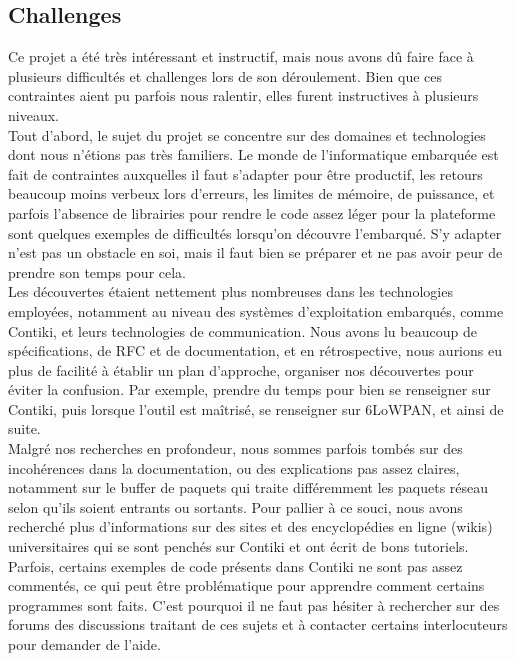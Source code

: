 	\subsection{Challenges} %
	    Ce projet a été très intéressant et instructif, mais nous avons dû faire face à plusieurs difficultés et challenges lors de son déroulement. Bien que ces contraintes aient pu parfois nous ralentir, elles furent instructives à plusieurs niveaux.\\
	    Tout d'abord, le sujet du projet se concentre sur des domaines et technologies dont nous n'étions pas très familiers. Le monde de l'informatique embarquée est fait de contraintes auxquelles il faut s'adapter pour être productif, les retours beaucoup moins verbeux lors d'erreurs, les limites de mémoire, de puissance, et parfois l'absence de librairies pour rendre le code assez léger pour la plateforme sont quelques exemples de difficultés lorsqu'on découvre l'embarqué. S'y adapter n'est pas un obstacle en soi, mais il faut bien se préparer et ne pas avoir peur de prendre son temps pour cela.\\
	    Les découvertes étaient nettement plus nombreuses dans les technologies employées, notamment au niveau des systèmes d'exploitation embarqués, comme Contiki, et leurs technologies de communication. Nous avons lu beaucoup de spécifications, de RFC et de documentation, et en rétrospective, nous aurions eu plus de facilité à établir un plan d'approche, organiser nos découvertes pour éviter la confusion. Par exemple, prendre du temps pour bien se renseigner sur Contiki, puis lorsque l'outil est maîtrisé, se renseigner sur 6LoWPAN, et ainsi de suite.\\
	    Malgré nos recherches en profondeur, nous sommes parfois tombés sur des incohérences dans la documentation, ou des explications pas assez claires, notamment sur le buffer de paquets qui traite différemment les paquets réseau selon qu'ils soient entrants ou sortants. Pour pallier à ce souci, nous avons recherché plus d'informations sur des sites et des encyclopédies en ligne (wikis) universitaires qui se sont penchés sur Contiki et ont écrit de bons tutoriels.\\
	    Parfois, certains exemples de code présents dans Contiki ne sont pas assez commentés, ce qui peut être problématique pour apprendre comment certains programmes sont faits. C'est pourquoi il ne faut pas hésiter à rechercher sur des forums des discussions traitant de ces sujets et à contacter certains interlocuteurs pour demander de l'aide.

